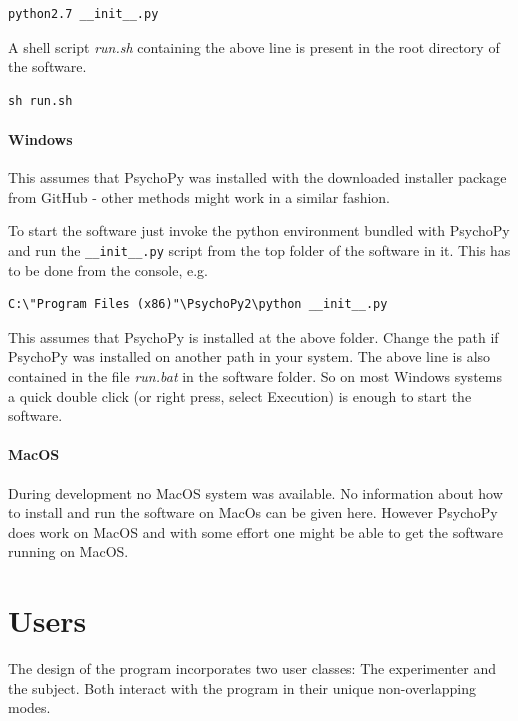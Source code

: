 \documentclass[12pt,a4paper]{book}
\begin{document}
\begin{verbatim}
python2.7 __init__.py
\end{verbatim}

A shell script \textit{run.sh} containing the above line is present in the root directory of the software.

\begin{verbatim}
sh run.sh
\end{verbatim}

\paragraph{Windows}

This assumes that PsychoPy was installed with the downloaded installer package from GitHub - other methods might work in a similar fashion.

To start the software just invoke the python environment bundled with PsychoPy and run the \verb|__init__.py| script from the top folder of the software in it. This has to be done from the console, e.g. 

\begin{verbatim}
C:\"Program Files (x86)"\PsychoPy2\python __init__.py
\end{verbatim}

This assumes that PsychoPy is installed at the above folder. Change the path if PsychoPy was installed on another path in your system. The above line is also contained in the file \textit{run.bat} in the software folder. So on most Windows systems a quick double click (or right press, select Execution) is enough to start the software.

\paragraph{MacOS}

During development no MacOS system was available. No information about how to install and run the software on MacOs can be given here. However PsychoPy does work on MacOS and with some effort one might be able to get the software running on MacOS.

\section{Users}

The design of the program incorporates two user classes: The experimenter and the subject. Both interact with the program in their unique non-overlapping modes.
\end{document}
